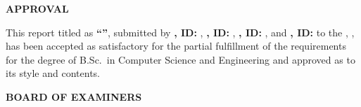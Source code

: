 
\clearpage
\thispagestyle{frontmatter}
{}

\begin{center}
    {\Large\bfseries APPROVAL}
\end{center}

\vspace{0.8cm}

\noindent This report titled as \textbf{``\reporttitle''}, submitted by \textbf{\studentonename, ID: \studentonereg}, \textbf{\studenttwoname, ID: \studenttworeg}, \textbf{\studentthreename, ID: \studentthreereg}, and \textbf{\studentfourname, ID: \studentfourreg} to the \departmentname, \universityname, has been accepted as satisfactory for the partial fulfillment of the requirements for the degree of B.Sc.\ in Computer Science and Engineering and approved as to its style and contents.

\vspace{1cm}

\begin{center}
    {\large\bfseries BOARD OF EXAMINERS}
\end{center}

\sigblockcompact{\chairmanname}{\chairmandesignation}{\departmentname}{\universityname}

\sigblockcompact{\supervisorname}{\supervisordesignation}{\departmentname}{\universityname}

\sigblockcompact{\externalexaminername}{\externalexaminerdesignation}{\departmentname}{\universityname}
